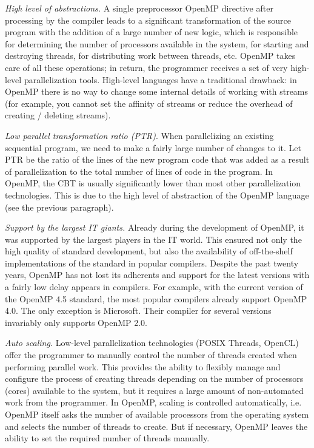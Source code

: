 {	\par\textit{High level of abstractions.} A single preprocessor OpenMP directive after processing by the compiler leads to a significant transformation of the source program with the addition of a large number of new logic, which is responsible for determining the number of processors available in the system, for starting and destroying threads, for distributing work between threads, etc. OpenMP takes care of all these operations; in return, the programmer receives a set of very high-level parallelization tools. High-level languages have a traditional drawback: in OpenMP there is no way to change some internal details of working with streams (for example, you cannot set the affinity of streams or reduce the overhead of creating / deleting streams).
	\par\textit{Low parallel transformation ratio (PTR)}. When parallelizing an existing sequential program, we need to make a fairly large number of changes to it. Let PTR be the ratio of the lines of the new program code that was added as a result of parallelization to the total number of lines of code in the program. In OpenMP, the CBT is usually significantly lower than most other parallelization technologies. This is due to the high level of abstraction of the OpenMP language (see the previous paragraph).
	\par\textit{Support by the largest IT giants.} Already during the development of OpenMP, it was supported by the largest players in the IT world. This ensured not only the high quality of standard development, but also the availability of off-the-shelf implementations of the standard in popular compilers. Despite the past twenty years, OpenMP has not lost its adherents and support for the latest versions with a fairly low delay appears in compilers. For example, with the current version of the OpenMP 4.5 standard, the most popular compilers already support OpenMP 4.0. The only exception is Microsoft. Their compiler for several versions invariably only supports OpenMP 2.0.
	\par\textit{Auto scaling.}  
	Low-level parallelization technologies (POSIX Threads, OpenCL) offer the programmer to manually control the number of threads created when performing parallel work. This provides the ability to flexibly manage and configure the process of creating threads depending on the number of processors (cores) available to the system, but it requires a large amount of non-automated work from the programmer. In OpenMP, scaling is controlled automatically, i.e. OpenMP itself asks the number of available processors from the operating system and selects the number of threads to create. But if necessary, OpenMP leaves the ability to set the required number of threads manually.
}
